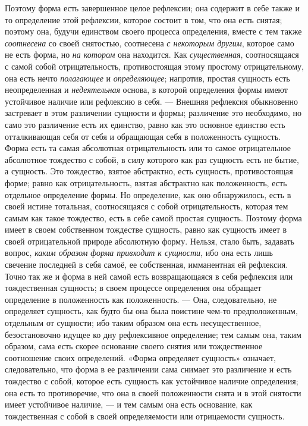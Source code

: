 Поэтому форма есть завершенное целое рефлексии; она содержит в себе также и
то определение этой рефлексии, которое состоит в том, что она есть снятая;
поэтому она, будучи единством своего процесса определения, вместе с тем
также {\em соотнесена} со своей снятостью, соотнесена
{\em с некоторым другим}, которое само не есть форма,
но {\em на котором} она находится. Как
{\em существенная}, соотносящаяся с самой собой
отрицательность, противостоящая этому простому отрицательному, она есть
нечто {\em полагающее} и
{\em определяющее}; напротив, простая сущность есть
неопределенная и {\em недеятельная} основа, в которой
определения формы имеют устойчивое наличие или рефлексию в себя. — Внешняя
рефлексия обыкновенно застревает в этом различении сущности и формы;
различение это необходимо, но само это различение есть их единство, равно
как это основное единство есть отталкивающая себя от себя и обращающая себя
в положенность сущность. Форма есть та самая абсолютная отрицательность или
то самое отрицательное абсолютное тождество с собой, в силу которого как
раз сущность есть не бытие, а сущность. Это тождество, взятое абстрактно,
есть сущность, противостоящая форме; равно как отрицательность, взятая
абстрактно как положенность, есть отдельное определение формы. Но
определение, как оно обнаружилось, есть в своей истине тотальная,
соотносящаяся с собой отрицательность, которая тем самым как такое
тождество, есть в себе самой простая сущность. Поэтому форма имеет в своем
собственном тождестве сущность, равно как сущность имеет в своей
отрицательной природе абсолютную форму. Нельзя, стало быть, задавать
вопрос, {\em каким образом форма привходит к сущности},
ибо она есть лишь свечение последней в себя самоё, ее собственная,
имманентная ей рефлексия. Точно так же и форма в ней самой есть
возвращающаяся в себя рефлексия или тождественная сущность; в своем
процессе определения она обращает определение в положенность как
положенность. — Она, следовательно, не определяет сущность, как будто бы
она была поистине чем-то предположенным, отдельным от сущности; ибо таким
образом она есть несущественное, безостановочно идущее ко дну рефлексивное
определение; тем самым она, таким образом, сама есть скорее основание
своего снятия или тождественное соотношение своих определений. «Форма
определяет сущность» означает, следовательно, что форма в ее различении
сама снимает это различение и есть тождество с собой, которое есть сущность
как устойчивое наличие определения; она есть то противоречие, что она в
своей положенности снята и в этой снятости имеет устойчивое наличие, — и
тем самым она есть основание, как тождественная с собой в своей
определяемости или отрицаемости сущность.

